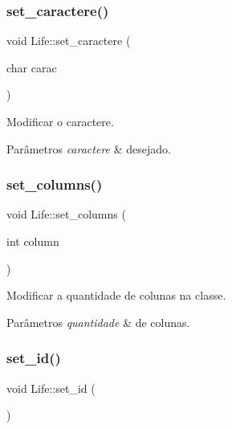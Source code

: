 \subsubsection{\texorpdfstring{set\+\_\+caractere()}{set\_caractere()}}
{\footnotesize\ttfamily void Life\+::set\+\_\+caractere (\begin{DoxyParamCaption}\item[{char}]{carac }\end{DoxyParamCaption})}

Modificar o caractere. 
\begin{DoxyParams}{Parâmetros}
{\em caractere} & desejado. \\
\hline
\end{DoxyParams}
\mbox{\label{classLife_a62931743c6915fecee04b7a613d724be}} 
\subsubsection{\texorpdfstring{set\+\_\+columns()}{set\_columns()}}
{\footnotesize\ttfamily void Life\+::set\+\_\+columns (\begin{DoxyParamCaption}\item[{int}]{column }\end{DoxyParamCaption})}

Modificar a quantidade de colunas na classe. 
\begin{DoxyParams}{Parâmetros}
{\em quantidade} & de colunas. \\
\hline
\end{DoxyParams}
\mbox{\label{classLife_a085768fbd7a228f0e4323208dbe99a0a}} 
\subsubsection{\texorpdfstring{set\+\_\+id()}{set\_id()}}
{\footnotesize\ttfamily void Life\+::set\+\_\+id (\begin{DoxyParamCaption}{ }\end{DoxyParamCaption})}

\mbox{\label{classLife_a2a76d59604c348b77e49af72a099ba31}} 
